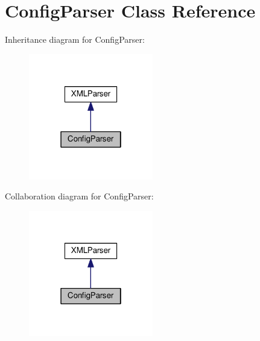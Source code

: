 \hypertarget{classConfigParser}{}\section{Config\+Parser Class Reference}
\label{classConfigParser}


Inheritance diagram for Config\+Parser\+:
\nopagebreak
\begin{figure}[H]
\begin{center}
\leavevmode
\includegraphics[width=154pt]{classConfigParser__inherit__graph}
\end{center}
\end{figure}


Collaboration diagram for Config\+Parser\+:
\nopagebreak
\begin{figure}[H]
\begin{center}
\leavevmode
\includegraphics[width=154pt]{classConfigParser__coll__graph}
\end{center}
\end{figure}
